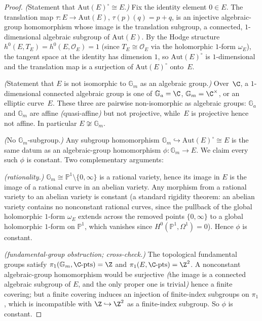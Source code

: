 \begin{proof}
\textit{(}Statement that $\mathrm{Aut}(E)^\circ \cong E$.\textit{)}
Fix the identity element $0 \in E$. The translation map
$\tau\colon E \to \mathrm{Aut}(E)$, $\tau(p)(q) = p + q$, is an
injective algebraic-group homomorphism whose image is the
translation subgroup, a connected, $1$-dimensional algebraic
subgroup of $\mathrm{Aut}(E)$. By the Hodge structure
$h^0(E, T_E) = h^0(E, \mathcal{O}_E) = 1$ (since $T_E \cong
\mathcal{O}_E$ via the holomorphic $1$-form $\omega_E$), the
tangent space at the identity has dimension $1$, so
$\mathrm{Aut}(E)^\circ$ is $1$-dimensional and the translation
map is a surjection of $\mathrm{Aut}(E)^\circ$ onto~$E$.

\textit{(}Statement that $E$ is not isomorphic to $\mathbb{G}_m$
as an algebraic group.\textit{)} Over~$\C$, a $1$-dimensional
connected algebraic group is one of $\mathbb{G}_a = \C$,
$\mathbb{G}_m = \C^\times$, or an elliptic curve~$E$. These three
are pairwise non-isomorphic as algebraic groups: $\mathbb{G}_a$
and $\mathbb{G}_m$ are affine \emph{(}quasi-affine\emph{)} but not
projective, while~$E$ is projective hence not affine. In
particular $E \not\cong \mathbb{G}_m$.

\textit{(}No $\mathbb{G}_m$-subgroup.\textit{)} Any subgroup
homomorphism $\mathbb{G}_m \hookrightarrow \mathrm{Aut}(E)^\circ
\cong E$ is the same datum as an algebraic-group homomorphism
$\phi\colon \mathbb{G}_m \to E$. We claim every such $\phi$ is
constant. Two complementary arguments:

\textit{(rationality.)} $\mathbb{G}_m \cong \mathbb{P}^1 \setminus
\{0, \infty\}$ is a rational variety, hence its image in $E$ is
the image of a rational curve in an abelian variety. Any
morphism from a rational variety to an abelian variety is
constant (a standard rigidity theorem: an abelian variety
contains no nonconstant rational curves, since the pullback of
the global holomorphic $1$-form $\omega_E$ extends across the
removed points $\{0, \infty\}$ to a global holomorphic $1$-form
on $\mathbb{P}^1$, which vanishes since $H^0(\mathbb{P}^1,
\Omega^1) = 0$). Hence $\phi$ is constant.

\textit{(fundamental-group obstruction; cross-check.)}
The topological fundamental groups satisfy $\pi_1(\mathbb{G}_m,
\C\text{-pts}) = \Z$ and $\pi_1(E, \C\text{-pts}) = \Z^2$. A
nonconstant algebraic-group homomorphism would be surjective
\emph{(}the image is a connected algebraic subgroup of $E$, and
the only proper one is trivial\emph{)} hence a finite covering;
but a finite covering induces an injection of finite-index
subgroups on $\pi_1$, which is incompatible with $\Z
\hookrightarrow \Z^2$ as a finite-index subgroup. So $\phi$ is
constant.


\end{proof}
